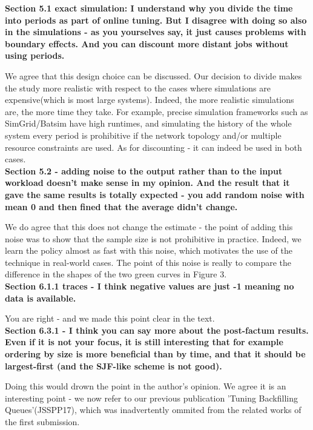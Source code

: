 \documentclass[]{article}
\begin{document}
\textbf{Section 5.1 exact simulation: I understand why you divide the time into
    periods as part of online tuning. But I disagree with doing so also in the
    simulations - as you yourselves say, it just causes problems with boundary
    effects.  And you can discount more distant jobs without using periods.}

We agree that this design choice can be discussed. Our decision to divide
makes the study more realistic with respect to the cases where simulations are
expensive(which is most large systems).  Indeed, the more realistic simulations
are, the more time they take. For example, precise simulation frameworks such
as SimGrid/Batsim have high runtimes, and simulating the history of the whole
system every period is prohibitive if the network topology and/or multiple
resource constraints are used. As for discounting - it can indeed be used
in both cases.\\

\textbf{Section 5.2 - adding noise to the output rather than to the input
    workload doesn't make sense in my opinion. And the result that it gave the
    same results is totally expected - you add random noise with mean 0 and
    then fined that the average didn't change.}

We do agree that this does not change the estimate - the point of adding 
this noise was to show that the sample size is not prohibitive in practice.
Indeed, we learn the policy almost as fast with this noise, which
motivates the use of the technique in real-world cases. The point of this noise
is really to compare the difference in the shapes of the two green curves
in Figure 3.\\

\textbf{Section 6.1.1 traces - I think negative values are just -1 meaning no data is available.}

You are right - and we made this point clear in the text.\\

\textbf{Section 6.3.1 - I think you can say more about the post-factum results.  Even
if it is not your focus, it is still interesting that for example ordering
by size is more beneficial than by time, and that it should be
largest-first (and the SJF-like scheme is not good).}

Doing this would drown the point in the author's opinion. We agree it is an
interesting point - we now refer to our previous publication 'Tuning
Backfilling Queues'(JSSPP17), which was inadvertently ommited from the related
works of the first submission.\\
\end{document}
